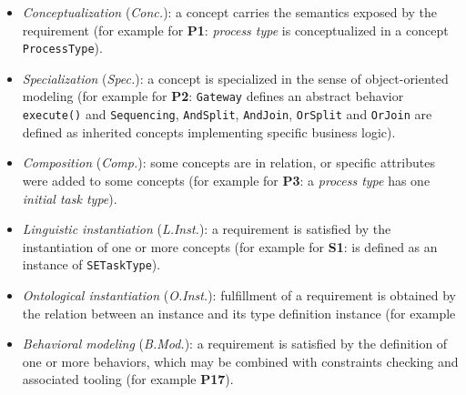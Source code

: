 \begin{itemize}
    \item \emph{Conceptualization} (\textit{Conc.}): a concept carries the semantics exposed by the requirement (for example for \textbf{P1}: \textit{process type} is conceptualized in a concept \texttt{ProcessType}).

    \item \emph{Specialization} (\textit{Spec.}): a concept is specialized in the sense of object-oriented modeling (for example for \textbf{P2}: \texttt{Gateway} defines an abstract behavior \texttt{execute()} and \texttt{Sequencing}, \texttt{AndSplit}, \texttt{AndJoin}, \texttt{OrSplit} and \texttt{OrJoin} are defined as inherited concepts implementing specific business logic).

    \item \emph{Composition} (\textit{Comp.}): some concepts are in relation, or specific attributes were added to some concepts (for example for \textbf{P3}: a \textit{process type} has one \textit{initial task type}).

    \item \emph{Linguistic instantiation} (\textit{L.Inst.}): a requirement is satisfied by the instantiation of one or more concepts (for example for \textbf{S1}:  is defined as an instance of \texttt{SETaskType}).

    \item \emph{Ontological instantiation} (\textit{O.Inst.}): fulfillment of a requirement is obtained by the relation between an instance and its type definition instance (for example 

    \item \emph{Behavioral modeling} (\textit{B.Mod.}): a requirement is satisfied by the definition of one or more behaviors, which may be combined with constraints checking and associated tooling (for example \textbf{P17}).
\end{itemize}




